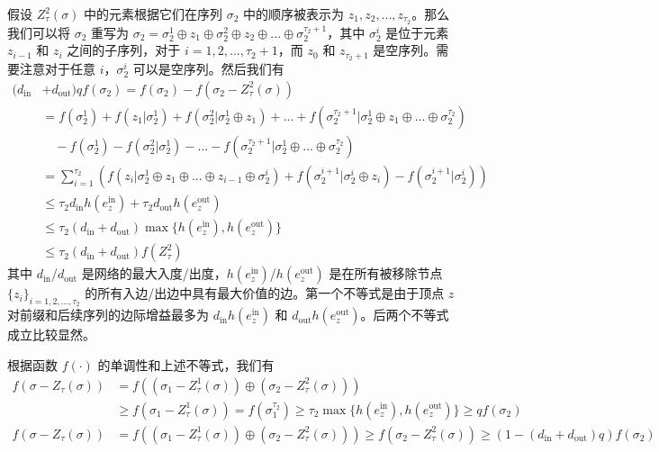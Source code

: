 假设 $Z^2_\tau(\sigma)$ 中的元素根据它们在序列 $\sigma_2$ 中的顺序被表示为 $z_1,z_2,...,z_{\tau_2}$。那么我们可以将 $\sigma_2$ 重写为 $\sigma_2=\sigma_2^1\oplus z_1 \oplus \sigma_2^2 \oplus z_2 \oplus ... \oplus \sigma_2^{\tau_2+1}$，其中 $\sigma_2^i$ 是位于元素 $z_{i-1}$ 和 $z_i$ 之间的子序列，对于 $i=1,2,...,\tau_2+1$，而 $z_0$ 和 $z_{\tau_2+1}$ 是空序列。需要注意对于任意 $i$，$\sigma_2^i$ 可以是空序列。然后我们有
\begin{align}
(d_{\text{in}} & + d_{\text{out}}) q f(\sigma_2) = f(\sigma_2) - f(\sigma_2-Z_\tau^2(\sigma)) \\
& = f(\sigma_2^1) + f(z_1|\sigma_2^1)+f(\sigma_2^2| \sigma_2^1\oplus z_1) + ... + f(\sigma_2^{\tau_2+1}| \sigma_2^1\oplus z_1 \oplus ... \oplus \sigma_2^{\tau_2}) \nonumber \\
& \quad - f(\sigma_2^1) -f(\sigma_2^2|\sigma_2^1) - ... - f(\sigma_2^{\tau_2+1}| \sigma_2^1\oplus ... \oplus \sigma_2^{\tau_2}) \\
& = \sum_{i=1}^{\tau_2} \left( f(z_i|\sigma_2^1\oplus z_1 \oplus ... \oplus z_{i-1}\oplus \sigma_2^i)+f(\sigma_2^{i+1}|\sigma_2^i\oplus z_i) - f(\sigma_2^{i+1}|\sigma_2^i) \right)\\
& \le \tau_2 d_{\text{in}} h(e_z^{\text{in}}) + \tau_2 d_{\text{out}} h(e_z^{\text{out}}) \\
& \le \tau_2(d_{\text{in}} + d_{\text{out}}) \max \{h(e_z^{\text{in}}),h(e_z^{\text{out}})\} \\
& \le \tau_2(d_{\text{in}} + d_{\text{out}}) f(Z_\tau^2)
\end{align}
\noindent 其中 $d_{\text{in}}$/$d_{\text{out}}$ 是网络的最大入度/出度，$h(e_z^{\text{in}})$/$h(e_z^{\text{out}})$ 是在所有被移除节点 $\{z_i\}_{i=1,2,...,\tau_2}$ 的所有入边/出边中具有最大价值的边。第一个不等式是由于顶点 $z$ 对前缀和后续序列的边际增益最多为 $d_{\text{in}} h(e_z^{\text{in}})$ 和 $d_{\text{out}} h(e_z^{\text{out}})$。后两个不等式成立比较显然。

根据函数 $f(\cdot)$ 的单调性和上述不等式，我们有
\begin{align}
f(\sigma- Z_\tau(\sigma)) & = f((\sigma_1 - Z_\tau^1(\sigma)) \oplus (\sigma_2 - Z_\tau^2(\sigma))) \\ &\ge f(\sigma_1 - Z_\tau^1(\sigma)) = f(\sigma_1^{\tau_2}) \ge \tau_2 \max \{h(e_z^{\text{in}}),h(e_z^{\text{out}})\} \ge q f(\sigma_2) \\
f(\sigma-Z_\tau(\sigma)) & = f((\sigma_1 - Z_\tau^1(\sigma)) \oplus (\sigma_2 - Z_\tau^2(\sigma))) \ge f(\sigma_2 -Z_\tau^2(\sigma)) \ge (1-(d_{\text{in}} + d_{\text{out}})q) f(\sigma_2)
\end{align}

